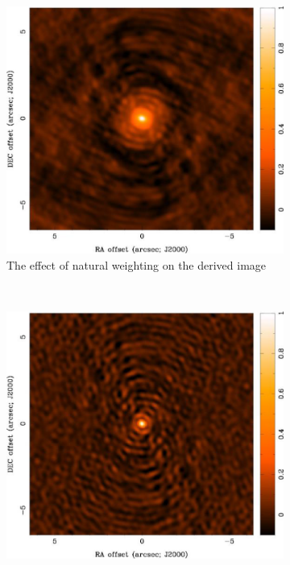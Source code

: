 \begin{figure}[h]
        \centering
        \begin{subfigure}[b]{0.3\textwidth}
                \includegraphics[width=\textwidth]{Figures/naturalWeight}
                \caption{The effect of natural weighting on the derived image}
                \label{fig:naturalWeight}
        \end{subfigure}%
        ~ %
        \begin{subfigure}[b]{0.3\textwidth}
                \includegraphics[width=\textwidth]{Figures/UniformWeight}

\end{subfigure}
\end{figure}
